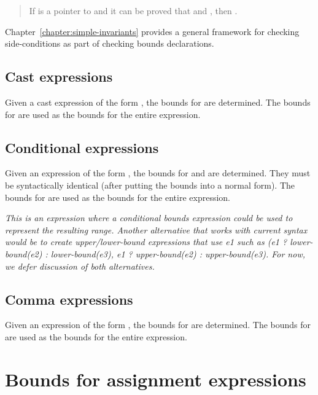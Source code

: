 \begin{quote}
If  is a pointer to  and it can be proved that
  and 
, then
.
\end{quote}

Chapter~\ref{chapter:simple-invariants}
provides a general framework for checking side-conditions as
part of checking bounds declarations.

\subsection{Cast expressions}
\label{section:cast-expressions}

Given a cast expression of the form ,
the bounds for  are determined. The bounds for
 are used as the bounds for the entire expression.
  
\subsection{Conditional expressions}

Given an expression of the form   
\code{:} , the bounds for  and  are
determined. They must be syntactically identical (after putting the
bounds into a normal form). The bounds for  are used as the
bounds for the entire expression.

\emph{This is an expression where a conditional bounds expression could
be used to represent the resulting range.  Another alternative that works
with current syntax would be to create upper/lower-bound expressions
that use e1 such as (e1 ? lower-bound(e2) : lower-bound(e3), e1 ?
upper-bound(e2) : upper-bound(e3). For now, we defer discussion of both
alternatives. }

\subsection{Comma expressions}

Given an expression of the form  \code{,} , the
bounds for  are determined. The bounds for  are used
as the bounds for the entire expression.

\section{Bounds for assignment expressions}
\label{section:checking-assignment-expressions}

